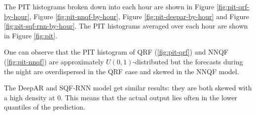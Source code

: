 The PIT histograms broken down into each hour are shown in Figure \ref{fig:pit-qrf-by-hour}, Figure \ref{fig:pit-nnqf-by-hour}, 
Figure \ref{fig:pit-deepar-by-hour} and Figure \ref{fig:pit-sqf-rnn-by-hour}. 
The PIT histograms averaged over each hour are shown in Figure \ref{fig:pit}. 

One can observe that the PIT histogram of QRF (\ref{fig:pit-qrf}) and NNQF (\ref{fig:pit-nnqf}) are approximately 
\(U(0,1)\)-distributed but the forecasts during the night are overdispersed in the QRF case and 
skewed in the NNQF model.

The DeepAR and SQF-RNN model get similar results: they are both skewed with a high density at \(0\). 
This means that the actual output lies often in the lower quantiles of the prediction. 